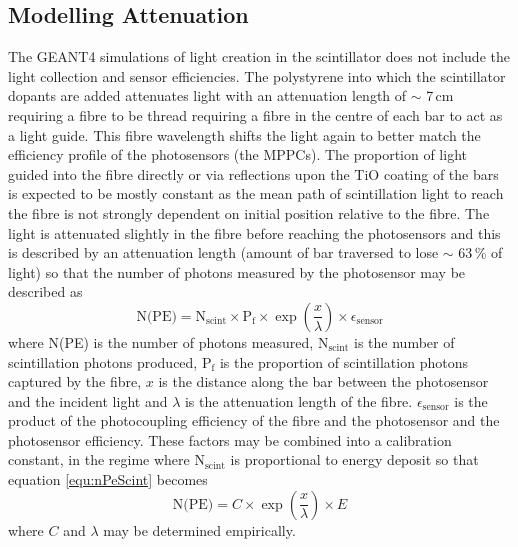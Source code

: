 \subsection{Modelling Attenuation}\label{sec:GEANT4Simulation_ModellingAttenuation}
The GEANT4 simulations of light creation in the scintillator does not include the light collection and sensor efficiencies. The polystyrene into which the scintillator dopants are
added attenuates light with an attenuation length of $\sim$ 7\,cm requiring a fibre to be thread requiring a fibre in the centre of each bar to act as a light guide. This fibre wavelength shifts the light again to better match the efficiency profile of the photosensors (the MPPCs). The proportion of light guided into the fibre directly or via reflections upon the TiO coating of the bars is expected to be mostly constant as the mean path of scintillation light to reach the fibre is not strongly dependent on initial position relative to the fibre. The light is attenuated slightly in the fibre before reaching the photosensors and this is described by an attenuation length (amount of bar traversed to lose $\sim$ 63\,\%  of light) so that the number of photons measured by the photosensor may be described as
\begin{equation}
    \textrm{N(PE)} = \textrm{N$_{\textrm{scint}}$} \times \textrm{P$_\textrm{f}$} \times \exp{ \left( \frac{x}{\lambda} \right) } \times \epsilon\textrm{$_{\textrm{sensor}}$}
\label{equ:nPeScint}
\end{equation}
where N(PE) is the number of photons measured, N$_{\textrm{scint}}$ is the number of scintillation photons produced, P$_\textrm{f}$ is the proportion of scintillation photons captured by the fibre, $x$ is the distance along the bar between the photosensor and the incident light and $\lambda$ is the attenuation length of the fibre. $\epsilon_{\textrm{sensor}}$ is the product of the photocoupling efficiency of the fibre and the photosensor and the photosensor efficiency. These factors may be combined into a calibration constant, in the regime where N$_{\textrm{scint}}$ is proportional to energy deposit so that equation \ref{equ:nPeScint} becomes
\begin{equation}
     \textrm{N(PE)} = C \times \exp{ \left( \frac{x}{\lambda} \right) } \times E 
 \label{equ:nPeScint2}
 \end{equation}
where $C$ and $\lambda$ may be determined empirically.
